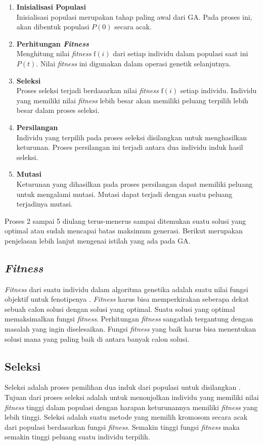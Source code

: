 \begin{enumerate}
	\item \textbf{Inisialisasi Populasi} \\
	Inisialisasi populasi merupakan tahap paling awal dari GA. Pada proses ini, akan dibentuk populasi $P(0)$ secara acak. 
	\item \textbf{Perhitungan \textit{Fitness}} \\
	Menghitung nilai \textit{fitness} $\textrm{f}(i)$ dari setiap individu dalam populasi saat ini $P(t)$. Nilai \textit{fitness} ini digunakan dalam operasi genetik selanjutnya.
	\item \textbf{Seleksi} \\
	Proses seleksi terjadi berdasarkan nilai \textit{fitness} $\textrm{f}(i)$ setiap individu. Individu yang memiliki nilai \textit{fitness} lebih besar akan memiliki peluang terpilih lebih besar dalam proses seleksi.
	\item \textbf{Persilangan} \\
	Individu yang terpilih pada proses seleksi disilangkan untuk menghasilkan keturunan. Proses persilangan ini terjadi antara dua individu induk hasil seleksi.
	\item \textbf{Mutasi} \\
	Keturunan yang dihasilkan pada proses persilangan dapat memiliki peluang untuk mengalami mutasi. Mutasi dapat terjadi dengan suatu peluang terjadinya mutasi.
\end{enumerate}

Proses 2 sampai 5 diulang terus-menerus sampai ditemukan suatu solusi yang optimal atau sudah mencapai batas maksimum generasi. Berikut merupakan penjelasan lebih lanjut mengenai istilah yang ada pada GA.

\subsection{\textit{Fitness}}
\label{sub:fitness}
\textit{Fitness} dari suatu individu dalam algoritma genetika adalah suatu nilai fungsi objektif untuk fenotipenya \cite{sivanandam2007introduction}. \textit{Fitness} harus bisa memperkirakan seberapa dekat sebuah calon solusi dengan solusi yang optimal. Suatu solusi yang optimal memaksimalkan fungsi \textit{fitness}. Perhitungan \textit{fitness} sangatlah tergantung dengan masalah yang ingin diselesaikan. Fungsi \textit{fitness} yang baik harus bisa menentukan solusi mana yang paling baik di antara banyak calon solusi.

\subsection{Seleksi}
\label{sub:selection}
Seleksi adalah proses pemilihan dua induk dari populasi untuk disilangkan \cite{sivanandam2007introduction}. Tujuan dari proses seleksi adalah untuk menonjolkan individu yang memiliki nilai \textit{fitness} tinggi dalam populasi dengan harapan keturunannya memiliki \textit{fitness} yang lebih tinggi. Seleksi adalah suatu metode yang memilih kromosom secara acak dari populasi berdasarkan fungsi \textit{fitness}. Semakin tinggi fungsi \textit{fitness} maka semakin tinggi peluang suatu individu terpilih. 

